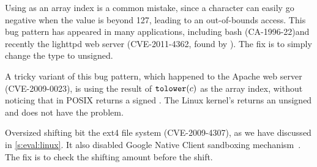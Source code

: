 Using  as an array index is a common mistake, since a
character can easily go negative when the value is beyond 127,
leading to an out-of-bounds access.  This bug pattern has appeared
in many applications, including bash (CA-1996-22)and recently the lighttpd
web server (CVE-2011-4362, found by
\sys).  The fix is to simply change the type to unsigned.

A tricky variant of this bug pattern, which happened to the Apache
web server (CVE-2009-0023), is using the result of $\texttt{tolower}(c)$
as the array index, without noticing that in POSIX 
returns a signed .  The Linux kernel's  returns
an unsigned  and does not have the problem.

Oversized shifting bit the ext4 file system (CVE-2009-4307),
as we have discussed in \autoref{s:eval:linux}.
It also disabled Google Native Client sandboxing mechanism~\cite{nacl}.
The fix is to check the shifting amount before the shift.

